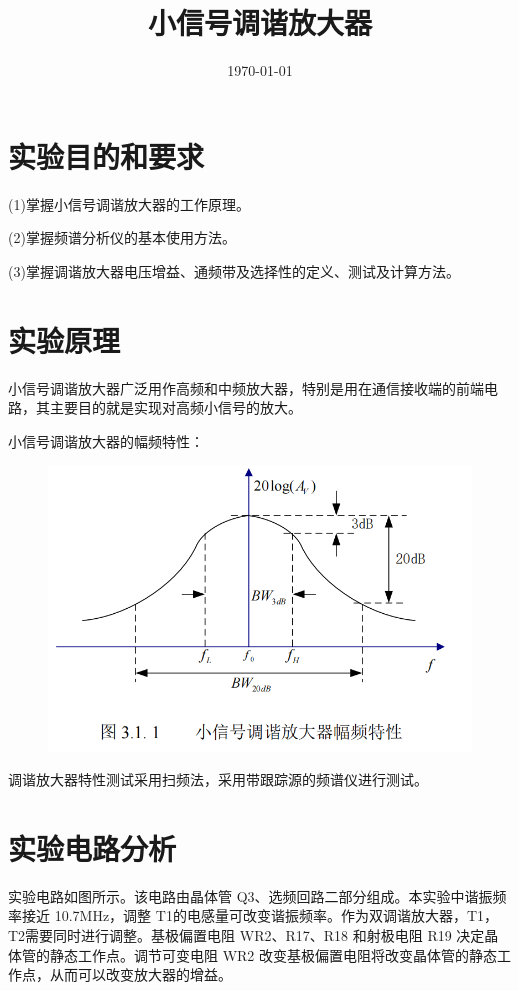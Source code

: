 \documentclass{../source/Experiment}
\title{小信号调谐放大器}
\date{\today}
\begin{document}
\section{实验目的和要求}
    (1)掌握小信号调谐放大器的工作原理。

    (2)掌握频谱分析仪的基本使用方法。

    (3)掌握调谐放大器电压增益、通频带及选择性的定义、测试及计算方法。

    \section{实验原理}
    小信号调谐放大器广泛用作高频和中频放大器，特别是用在通信接收端的前端电路，其主要目的就是实现对高频小信号的放大。

    小信号调谐放大器的幅频特性：
    \begin{figure}[H]
        \centering
        \includegraphics[scale=0.4]{pic/fig1.png}
    \end{figure}

    调谐放大器特性测试采用扫频法，采用带跟踪源的频谱仪进行测试。

    \section{实验电路分析}

    实验电路如图所示。该电路由晶体管 Q3、选频回路二部分组成。本实验中谐振频率接近 10.7MHz，调整 T1的电感量可改变谐振频率。作为双调谐放大器，T1，T2需要同时进行调整。基极偏置电阻 WR2、R17、R18 和射极电阻 R19 决定晶体管的静态工作点。调节可变电阻 WR2 改变基极偏置电阻将改变晶体管的静态工作点，从而可以改变放大器的增益。
    
\end{document}
